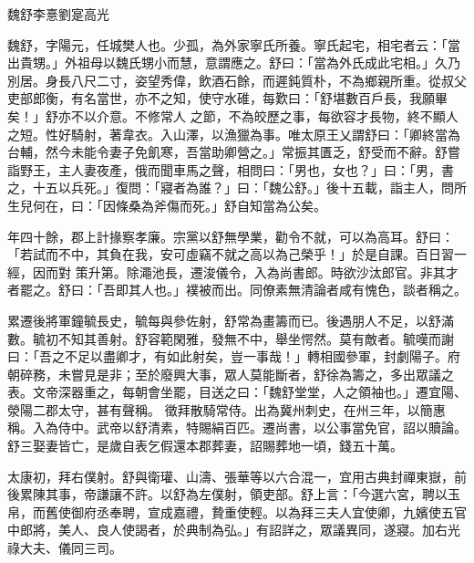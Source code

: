 
\begin{pinyinscope}

 魏舒李憙劉寔高光



 魏舒，字陽元，任城樊人也。少孤，為外家寧氏所養。寧氏起宅，相宅者云：「當出貴甥。」外祖母以魏氏甥小而慧，意謂應之。舒曰：「當為外氏成此宅相。」久乃別居。身長八尺二寸，姿望秀偉，飲酒石餘，而遲鈍質朴，不為鄉親所重。從叔父吏部郎衡，有名當世，亦不之知，使守水碓，每歎曰：「舒堪數百戶長，我願畢矣！」舒亦不以介意。不修常人
 之節，不為皎歷之事，每欲容才長物，終不顯人之短。性好騎射，著韋衣。入山澤，以漁獵為事。唯太原王乂謂舒曰：「卿終當為台輔，然今未能令妻子免飢寒，吾當助卿營之。」常振其匱乏，舒受而不辭。舒嘗詣野王，主人妻夜產，俄而聞車馬之聲，相問曰：「男也，女也？」曰：「男，書之，十五以兵死。」復問：「寢者為誰？」曰：「魏公舒。」後十五載，詣主人，問所生兒何在，曰：「因條桑為斧傷而死。」舒自知當為公矣。



 年四十餘，郡上計掾察孝廉。宗黨以舒無學業，勸令不就，可以為高耳。舒曰：「若試而不中，其負在我，安可虛竊不就之高以為己榮乎！」於是自課。百日習一經，因而對
 策升第。除澠池長，遷浚儀令，入為尚書郎。時欲沙汰郎官。非其才者罷之。舒曰：「吾即其人也。」襆被而出。同僚素無清論者咸有愧色，談者稱之。



 累遷後將軍鐘毓長史，毓每與參佐射，舒常為畫籌而已。後遇朋人不足，以舒滿數。毓初不知其善射。舒容範閑雅，發無不中，舉坐愕然。莫有敵者。毓嘆而謝曰：「吾之不足以盡卿才，有如此射矣，豈一事哉！」轉相國參軍，封劇陽子。府朝碎務，未嘗見是非；至於廢興大事，眾人莫能斷者，舒徐為籌之，多出眾議之表。文帝深器重之，每朝會坐罷，目送之曰：「魏舒堂堂，人之領袖也。」遷宜陽、滎陽二郡太守，甚有聲稱。
 徵拜散騎常侍。出為冀州刺史，在州三年，以簡惠稱。入為侍中。武帝以舒清素，特賜絹百匹。遷尚書，以公事當免官，詔以贖論。舒三娶妻皆亡，是歲自表乞假還本郡葬妻，詔賜葬地一頃，錢五十萬。



 太康初，拜右僕射。舒與衛瓘、山濤、張華等以六合混一，宜用古典封禪東嶽，前後累陳其事，帝謙讓不許。以舒為左僕射，領吏部。舒上言：「今選六宮，聘以玉帛，而舊使御府丞奉聘，宣成嘉禮，贄重使輕。以為拜三夫人宜使卿，九嬪使五官中郎將，美人、良人使謁者，於典制為弘。」有詔詳之，眾議異同，遂寢。加右光祿大夫、儀同三司。




\end{pinyinscope}
